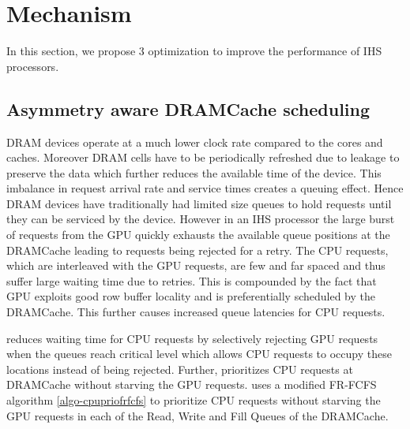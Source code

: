 \section{\cachename Mechanism} \label{mechanism}
In this section, we propose 3 optimization to improve the performance of IHS processors.
\subsection{Asymmetry aware DRAMCache scheduling}
DRAM devices operate at a much lower clock rate compared to the cores and caches. Moreover DRAM cells have to be periodically refreshed due to leakage to preserve the data which further reduces the available time of the device. This imbalance in request arrival rate and service times creates a queuing effect. Hence DRAM devices have traditionally had limited size queues to hold requests until they can be serviced by the device. However in an IHS processor the large burst of requests from the GPU quickly exhausts the available queue positions at the DRAMCache  leading to requests being rejected for a retry. The CPU requests, which are interleaved with the GPU requests, are few and far spaced and thus suffer large waiting time due to retries. This is compounded by the fact that GPU exploits good row buffer locality and is preferentially scheduled by the DRAMCache. This further causes increased queue latencies for CPU requests.
\par \cachename reduces waiting time for CPU requests by selectively rejecting GPU requests when the queues reach critical level which allows CPU requests to occupy these locations instead of being rejected. Further, \cachename prioritizes CPU requests at DRAMCache without starving the GPU requests. \cachename uses a modified FR-FCFS algorithm \ref{algo-cpupriofrfcfs} to prioritize CPU requests without starving the GPU requests in each of the Read, Write and Fill Queues of the DRAMCache.

